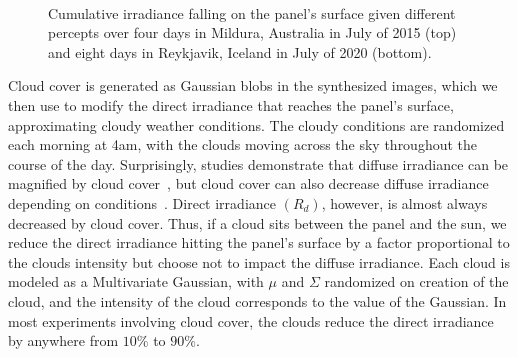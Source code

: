 \documentclass{article}
\begin{document}
{\begin{figure}[t]
\begin{center}
	 \\ %
\caption{Cumulative irradiance falling on the panel's surface given different percepts over four days in Mildura, Australia in July of 2015 (top) and eight days in Reykjavik, Iceland in July of 2020 (bottom).}
\label{fig:results_aus}
\end{center}
\end{figure}


Cloud cover is generated as Gaussian blobs in the synthesized images, which we then use to modify the direct irradiance that reaches the panel's surface, approximating cloudy weather conditions. The cloudy conditions are randomized each morning at 4am, with the clouds moving across the sky throughout the course of the day. Surprisingly, studies demonstrate that diffuse irradiance can be magnified by cloud cover~\cite{robinson1966solar}, but cloud cover can also decrease diffuse irradiance depending on conditions~\cite{pfister2003cloud}. Direct irradiance $(R_d)$, however, is almost always decreased by cloud cover. Thus, if a cloud sits between the panel and the sun, we reduce the direct irradiance hitting the panel's surface by a factor proportional to the clouds intensity but choose not to impact the diffuse irradiance. Each cloud is modeled as a Multivariate Gaussian, with $\mu$ and $\Sigma$ randomized on creation of the cloud, and the intensity of the cloud corresponds to the value of the Gaussian. In most experiments involving cloud cover, the clouds reduce the direct irradiance by anywhere from $10\%$ to $90\%$.



}
\end{document}
